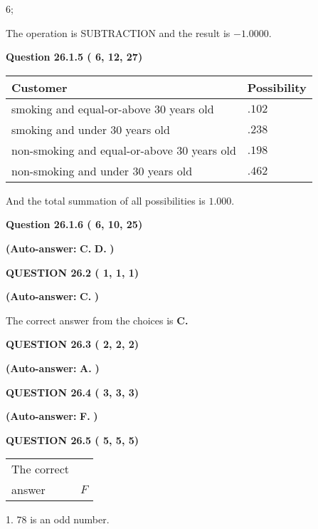 \documentclass[12pt]{article}
\begin{document}
6;
 
The operation is  %
SUBTRACTION and the result is
$ %
-1.0000$.
 
  
  
{\textbf{\large{Question
26.1.5 
 (          6,         12,         27)
}}}

 
\noindent
\begin{tabular}{|l|l|}
\hline
Customer & Possibility \\
\hline
smoking  and  %
equal-or-above 30 years old &
  $ %
.102$ \\
\hline
smoking  and  %
under 30 years old &
  $ %
.238$ \\
\hline
 non-smoking and  %
equal-or-above 30 years old &
  $ %
.198$ \\
\hline
 non-smoking and  %
under 30 years old &
  $ %
.462$ \\
\hline
\end{tabular}
 
\noindent
 And the total summation of all possibilities is $  %
1.000 $.
 
  
  
{\textbf{\large{Question
26.1.6 
 (          6,         10,         25)
}}}
 
 
{\textbf{(Auto-answer:}}
{\textbf{\large{
C.}}}
{\textbf{\large{
D.}}}
{\textbf{)}}
 
 
  
  
{\textbf{\large{QUESTION
26.2 
 (          1,          1,          1)
}}}
 
 
{\textbf{(Auto-answer:}}
{\textbf{\large{
C.}}}
{\textbf{)}}
 
 

The correct answer from the choices is
{\textbf{\large{
C.}}}
 
  
  
{\textbf{\large{QUESTION
26.3 
 (          2,          2,          2)
}}}
 
 
{\textbf{(Auto-answer:}}
{\textbf{\large{
A.}}}
{\textbf{)}}
 
 
  
  
{\textbf{\large{QUESTION
26.4 
 (          3,          3,          3)
}}}
 
 
{\textbf{(Auto-answer:}}
{\textbf{\large{
F.}}}
{\textbf{)}}
 
 
  
  
{\textbf{\large{QUESTION
26.5 
 (          5,          5,          5)
}}}

 
\noindent\begin{tabular}{|l|l|}\hline The correct & \\
          answer &  %
$F$ \\ \hline \end{tabular}
1. $ %
78$ is an  %
odd number.
 
\end{document}
